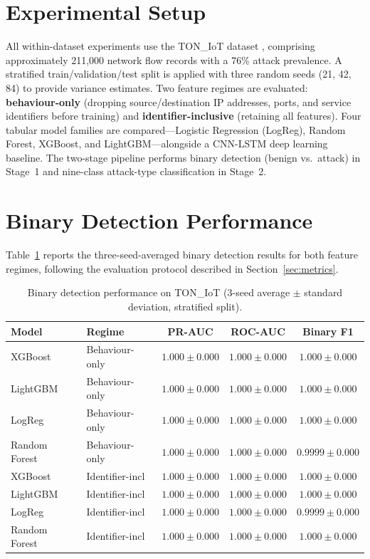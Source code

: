 \documentclass[12pt,a4paper]{report}
\begin{document}
\section{Experimental Setup}
\label{sec:setup}

All within-dataset experiments use the TON\_IoT dataset \citep{alsaedi2020}, comprising approximately 211,000 network flow records with a 76\% attack prevalence. A stratified train/validation/test split is applied with three random seeds (21, 42, 84) to provide variance estimates. Two feature regimes are evaluated: \textbf{behaviour-only} (dropping source/destination IP addresses, ports, and service identifiers before training) and \textbf{identifier-inclusive} (retaining all features). Four tabular model families are compared---Logistic Regression (LogReg), Random Forest, XGBoost, and LightGBM---alongside a CNN-LSTM deep learning baseline. The two-stage pipeline performs binary detection (benign vs.\ attack) in Stage~1 and nine-class attack-type classification in Stage~2.

\section{Binary Detection Performance}
\label{sec:binary-results}

Table~\ref{tab:binary} reports the three-seed-averaged binary detection results for both feature regimes, following the evaluation protocol described in Section~\ref{sec:metrics}.

\begin{table}[H]
\centering
\caption{Binary detection performance on TON\_IoT (3-seed average $\pm$ standard deviation, stratified split).}
\label{tab:binary}
\begin{tabular}{llccc}
\toprule
\textbf{Model} & \textbf{Regime} & \textbf{PR-AUC} & \textbf{ROC-AUC} & \textbf{Binary F1} \\
\midrule
XGBoost & Behaviour-only & $1.000 \pm 0.000$ & $1.000 \pm 0.000$ & $1.000 \pm 0.000$ \\
LightGBM & Behaviour-only & $1.000 \pm 0.000$ & $1.000 \pm 0.000$ & $1.000 \pm 0.000$ \\
LogReg & Behaviour-only & $1.000 \pm 0.000$ & $1.000 \pm 0.000$ & $1.000 \pm 0.000$ \\
Random Forest & Behaviour-only & $1.000 \pm 0.000$ & $1.000 \pm 0.000$ & $0.9999 \pm 0.000$ \\
\midrule
XGBoost & Identifier-incl & $1.000 \pm 0.000$ & $1.000 \pm 0.000$ & $1.000 \pm 0.000$ \\
LightGBM & Identifier-incl & $1.000 \pm 0.000$ & $1.000 \pm 0.000$ & $1.000 \pm 0.000$ \\
LogReg & Identifier-incl & $1.000 \pm 0.000$ & $1.000 \pm 0.000$ & $0.9999 \pm 0.000$ \\
Random Forest & Identifier-incl & $1.000 \pm 0.000$ & $1.000 \pm 0.000$ & $1.000 \pm 0.000$ \\
\bottomrule
\end{tabular}
\end{table}
\end{document}
